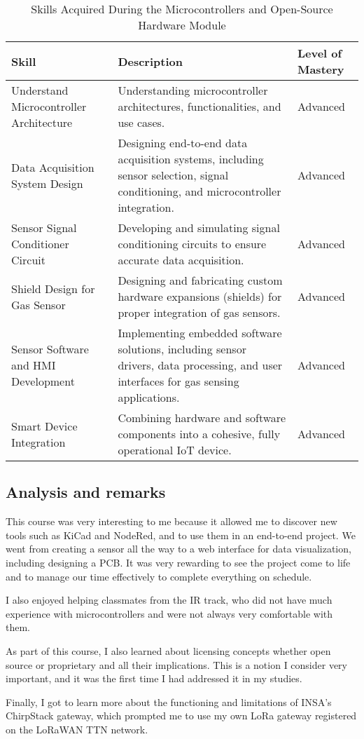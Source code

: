 \begin{table}[H]
    \centering
    \renewcommand{\arraystretch}{1.5} %
    \begin{tabular}{|p{3.5cm}|p{8cm}|p{3.5cm}|}
    \hline
    \rowcolor[gray]{0.8}
    \textbf{Skill} & \textbf{Description} & \textbf{Level of Mastery} \\
    \hline
    Understand Microcontroller Architecture & 
    Understanding microcontroller architectures, functionalities, and use cases. & 
    Advanced \\
    \hline
    Data Acquisition System Design & 
    Designing end-to-end data acquisition systems, including sensor selection, signal conditioning, and microcontroller integration. & 
    Advanced \\
    \hline
    Sensor Signal Conditioner Circuit & 
    Developing and simulating signal conditioning circuits to ensure accurate data acquisition. & 
    Advanced \\
    \hline
    Shield Design for Gas Sensor & 
    Designing and fabricating custom hardware expansions (shields) for proper integration of gas sensors. & 
    Advanced \\
    \hline
    Sensor Software and HMI Development & 
    Implementing embedded software solutions, including sensor drivers, data processing, and user interfaces for gas sensing applications. & 
    Advanced \\
    \hline
    Smart Device Integration & 
    Combining hardware and software components into a cohesive, fully operational IoT device. & 
    Advanced \\
    \hline
    \end{tabular}
    \caption{Skills Acquired During the Microcontrollers and Open-Source Hardware Module}
\end{table}

\subsection{Analysis and remarks}

\indent \indent This course was very interesting to me because it allowed me to discover new tools such as KiCad and NodeRed, and to use them in an end-to-end project. We went from creating a sensor all the way to a web interface for data visualization, including designing a PCB. It was very rewarding to see the project come to life and to manage our time effectively to complete everything on schedule.

I also enjoyed helping classmates from the IR track, who did not have much experience with microcontrollers and were not always very comfortable with them.

As part of this course, I also learned about licensing concepts whether open source or proprietary and all their implications. This is a notion I consider very important, and it was the first time I had addressed it in my studies.

Finally, I got to learn more about the functioning and limitations of INSA's ChirpStack gateway, which prompted me to use my own LoRa gateway registered on the LoRaWAN TTN network.

